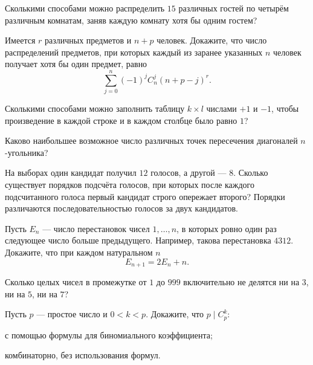 

\ifPDFTeX
  \renewcommand{\rmdefault}{cmr}
\fi

\def\SheetNo{5}
\setlength{\emergencystretch}{2em}



\begin{problems}

\item Сколькими способами можно распределить $15$ различных гостей по четырём различным комнатам, заняв каждую комнату хотя бы одним гостем?

\item Имеется $r$ различных предметов и $n+p$ человек. Докажите, что число распределений предметов, при которых каждый из заранее указанных $n$ человек получает хотя бы один предмет, равно
\[
\sum_{j=0}^{n}(-1)^j C_n^j(n+p-j)^r.
\]

\item Сколькими способами можно заполнить таблицу $k\times l$ числами $+1$ и $-1$, чтобы произведение в каждой строке и в каждом столбце было равно $1$?

\item Каково наибольшее возможное число различных точек пересечения диагоналей $n$-угольника?

\item На выборах один кандидат получил $12$ голосов, а другой --- $8$. Сколько существует порядков подсчёта голосов, при которых после каждого подсчитанного голоса первый кандидат строго опережает второго? Порядки различаются последовательностью голосов за двух кандидатов.

\item Пусть $E_n$ --- число перестановок чисел $1,\ldots,n$, в которых ровно один раз следующее число больше предыдущего. Например, такова перестановка $4312$. Докажите, что при каждом натуральном $n$
\[
E_{n+1}=2E_n+n.
\]

\item Сколько целых чисел в промежутке от $1$ до $999$ включительно не делятся ни на $3$, ни на $5$, ни на $7$?

\item Пусть $p$ --- простое число и $0<k<p$. Докажите, что $p\mid C_p^k$:
\begin{parts}
  \item с помощью формулы для биномиального коэффициента;
  \item комбинаторно, без использования формул.
\end{parts}


\end{problems}
